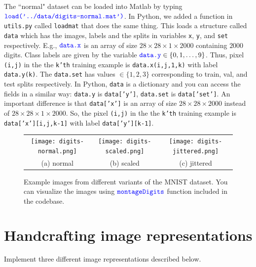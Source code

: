 \documentclass[10pt,letterpaper]{article}
\newcommand{\cmd}[1] {{\color{blue}\texttt{#1}}}
\begin{document}
The ``normal" dataset can be loaded into Matlab by typing $\cmd{load('../data/digits-normal.mat')}$. 
In Python, we added a function in \cmd{utils.py} called \cmd{loadmat} that does the same thing. 
This loads a structure called \cmd{data} which has the images, labels and the splits in variables \cmd{x}, \cmd{y}, and \cmd{set} respectively. 
E.g., $\cmd{data.x}$ is an array of size $28 \times 28 \times 1 \times2000$ containing $2000$ digits. 
Class labels are given by the variable $\cmd{data.y} \in \{0,1,\ldots, 9\}$. 
Thus, pixel \cmd{(i,j)} in the the \cmd{k'th} training example is \cmd{data.x(i,j,1,k)} with label \cmd{data.y(k)}. 
The \cmd{data.set} has values $\in\{1,2,3\}$ corresponding to train, val, and test splits respectively.
In Python, \cmd{data} is a dictionary and you can access the fields in a similar way:
\cmd{data.y} is \cmd{data['y']}, \cmd{data.set} is \cmd{data['set']}.
An important difference is that \cmd{data['x']} is an array of size $28 \times 28 \times 2000$ instead of $28 \times 28 \times 1 \times2000$.
So, the pixel \cmd{(i,j)} in the the \cmd{k'th} training example is \cmd{data['x'][i,j,k-1]} with label \cmd{data['y'][k-1]}.

\begin{figure}[h]
\centering
\begin{tabular}{ccc}
\texttt{[image: digits-normal.png]} & 
\texttt{[image: digits-scaled.png]} & 
\texttt{[image: digits-jittered.png]} \\
(a) normal & (b) scaled & (c) jittered \\
\end{tabular}
\caption{Example images from different variants of the MNIST
  dataset. You can visualize the images using $\cmd{montageDigits}$
  function included in the codebase.} 
\end{figure}


\newpage

\section{Handcrafting image representations}

Implement three different image representations described below. 
\end{document}
